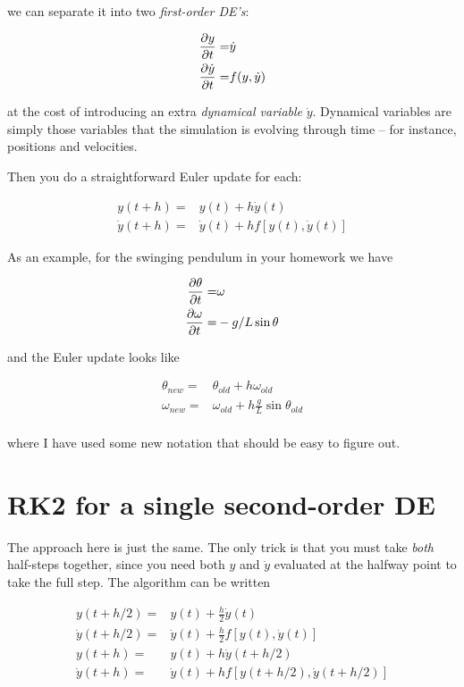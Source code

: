 \documentclass[12ampt]{article}
\def\PAR#1#2{ {{\partial #1}\over{\partial #2}} }
\begin{document}
we can separate it into two {\it first-order DE's}:

\begin{align}
  \PAR {y}{t} =& \dot y \\
  \PAR {\dot y}{t} =& f(y,\dot y)
\end{align}

at the cost of introducing an extra {\it dynamical variable} $\dot y$. Dynamical variables are simply those variables that the simulation is evolving through time -- for instance, positions and velocities.

Then you do a straightforward Euler update for each:

\begin{align}
  y(t+h) =& y(t) + h \dot y(t) \\
  \dot y(t+h) =& \dot y(t) + h f\left[y(t),\dot y(t)\right]
\end{align}

As an example, for the swinging pendulum in your homework we have

\begin{align}
  \PAR{\theta}{t} =& \omega \\
  \PAR{\omega}{t} =& -g/L \sin \theta
\end{align}

and the Euler update looks like

\begin{align}
  \theta_{new} =& \theta_{old} + h \omega_{old} \\
  \omega_{new} =& \omega_{old} + h \frac{g}{L} \sin \theta_{old} \\
\end{align}

where I have used some new notation that should be easy to figure out.


\section{RK2 for a single second-order DE}

The approach here is just the same. The only trick is that you must take {\it both} half-steps together, since you need both $y$ and $\dot y$ evaluated at the halfway point to take the full step. The algorithm can be written

  \begin{align}
    y\left(t+h/2\right) =& y(t) + \frac{h}{2} \dot y(t) \\
    \dot y\left(t+h/2\right) =& \dot y(t) + \frac{h}{2} f\left[y(t),\dot y(t)\right] \\
    y(t+h) =& y(t) + h \dot y(t+h/2) \\
   \dot y(t+h) =& \dot y(t) + h f\left[y\left(t+h/2\right),\dot y\left(t+h/2\right)\right]
  \end{align}
\end{document}
